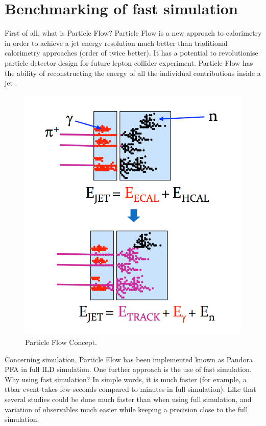 \section{Benchmarking of fast simulation}

First of all, what is Particle Flow? Particle Flow is a new approach to calorimetry in order to achieve a jet energy resolution much better than traditional calorimetry approaches (order of twice better). It has a potential to revolutionise particle detector design for future lepton collider experiment. Particle Flow has the ability of reconstructing the energy of all the individual contributions inside a jet \cite{Thomson}.

\begin{figure}[t]
  \centering
  \includegraphics[scale=0.3]{chap6/fig_SGV/PFlow.png}
  \caption{Particle Flow Concept.}
  \label{fig:pflow}
\end{figure}

Concerning simulation, Particle Flow has been implemented known as Pandora PFA in full ILD simulation. One further approach is the use of fast simulation. Why using fast simulation? In simple words, it is much faster (for example, a ttbar event takes few seconds compared to minutes in full simulation). Like that several studies could be done much faster than when using full simulation, and variation of observables much easier while keeping a precision close to the full simulation. \\

